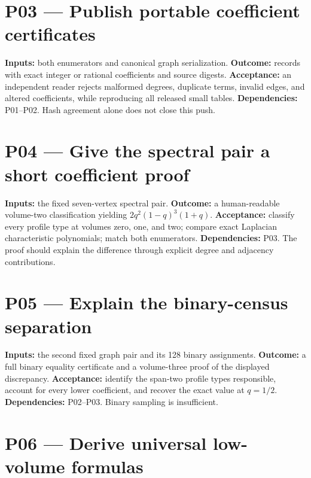 \documentclass[
  11pt,
  a4paper,
]{report}
\let\singularitytexttt\texttt
\renewcommand{\texttt}[1]{\singularitytexttt{\seqsplit{#1}}}
\begin{document}
\hypertarget{p03-publish-portable-coefficient-certificates}{%
\section{P03 --- Publish portable coefficient
certificates}\label{p03-publish-portable-coefficient-certificates}}

\textbf{Inputs:} both enumerators and canonical graph serialization.
\textbf{Outcome:} \texttt{relational-height/1} records with exact
integer or rational coefficients and source digests.
\textbf{Acceptance:} an independent reader rejects malformed degrees,
duplicate terms, invalid edges, and altered coefficients, while
reproducing all released small tables. \textbf{Dependencies:} P01--P02.
Hash agreement alone does not close this push.

\hypertarget{p04-give-the-spectral-pair-a-short-coefficient-proof}{%
\section{P04 --- Give the spectral pair a short coefficient
proof}\label{p04-give-the-spectral-pair-a-short-coefficient-proof}}

\textbf{Inputs:} the fixed seven-vertex spectral pair. \textbf{Outcome:}
a human-readable volume-two classification yielding
\(2q^2(1-q)^3(1+q)\). \textbf{Acceptance:} classify every profile type
at volumes zero, one, and two; compare exact Laplacian characteristic
polynomials; match both enumerators. \textbf{Dependencies:} P03. The
proof should explain the difference through explicit degree and
adjacency contributions.

\hypertarget{p05-explain-the-binary-census-separation}{%
\section{P05 --- Explain the binary-census
separation}\label{p05-explain-the-binary-census-separation}}

\textbf{Inputs:} the second fixed graph pair and its 128 binary
assignments. \textbf{Outcome:} a full binary equality certificate and a
volume-three proof of the displayed discrepancy. \textbf{Acceptance:}
identify the span-two profile types responsible, account for every lower
coefficient, and recover the exact value at \(q=1/2\).
\textbf{Dependencies:} P02--P03. Binary sampling is insufficient.

\hypertarget{p06-derive-universal-low-volume-formulas}{%
\section{P06 --- Derive universal low-volume
formulas}\label{p06-derive-universal-low-volume-formulas}}
\end{document}
